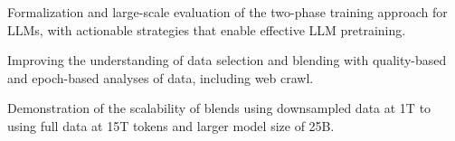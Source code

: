 \documentclass[11pt]{article}
\newenvironment{tight_itemize}{
\begin{itemize}
  \setlength{\itemsep}{0pt}
  \setlength{\parskip}{0pt}
}{\end{itemize}}
\newcommand{\mostofa}[1]{{\color{blue}\bf [MP: #1]}\xspace}
\begin{document}


\vspace{-0.2cm}
\begin{tight_itemize}
\item Formalization and large-scale evaluation of the two-phase training approach for LLMs, with actionable strategies that enable effective LLM pretraining.
\item Improving the understanding of data selection and blending with quality-based and epoch-based analyses of data, including web crawl.
\item Demonstration of the scalability of blends using downsampled data at 1T to using full data at 15T tokens and larger model size of 25B. 
\end{tight_itemize}

\end{document}
